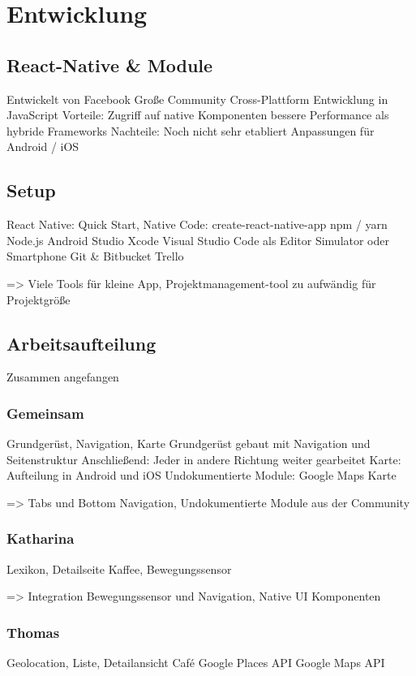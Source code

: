\chapter{Entwicklung}
\label{entwicklung}


\section{React-Native \& Module}
Entwickelt von Facebook
Große Community
Cross-Plattform
Entwicklung in JavaScript
Vorteile:
Zugriff auf native Komponenten
bessere Performance als hybride Frameworks
Nachteile:
Noch nicht sehr etabliert
Anpassungen für Android / iOS


\section{Setup}
React Native: Quick Start, Native Code: create-react-native-app
npm / yarn
Node.js
Android Studio
Xcode
Visual Studio Code als Editor
Simulator oder Smartphone
Git \& Bitbucket
Trello

=> Viele Tools für kleine App, Projektmanagement-tool zu aufwändig für Projektgröße



\section{Arbeitsaufteilung}
Zusammen angefangen

\subsection{Gemeinsam}
Grundgerüst, Navigation, Karte
Grundgerüst gebaut mit Navigation und Seitenstruktur
Anschließend: Jeder in andere Richtung weiter gearbeitet
Karte: Aufteilung in Android und iOS
Undokumentierte Module: Google Maps Karte

=> Tabs und Bottom Navigation, Undokumentierte Module aus der Community


\subsection{Katharina}
Lexikon, Detailseite Kaffee, Bewegungssensor

=> Integration Bewegungssensor und Navigation, Native UI Komponenten

\subsection{Thomas}
Geolocation, Liste, Detailansicht Café
Google Places API
Google Maps API

